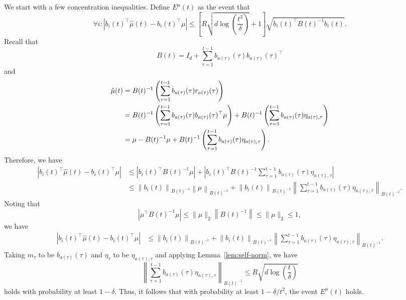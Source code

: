 \documentclass[letterpaper,11pt]{article}
\begin{document}
We start with a few concentration inequalities. 
Define $E^{\mu}(t)$ as the event that 
\begin{equation*}
    \forall i: \left|b_i(t)^\top \hat{\mu}(t) - b_i(t)^\top \mu\right| \leq \left[R \sqrt{d \log \left(\frac{t^3}{\delta}\right)} + 1\right] \sqrt{b_i(t)^\top B(t)^{-1} b_i(t)}. 
\end{equation*}
Recall that 
\begin{equation*}
    B(t) = I_d + \sum_{\tau=1}^{t-1} b_{a(\tau)}(\tau) b_{a(\tau)}(\tau)^\top 
\end{equation*}
and 
\begin{equation*}
\begin{aligned}
    \hat{\mu}(t) &= B(t)^{-1} \left(\sum_{\tau=1}^{t-1} b_{a(\tau)}(\tau) r_{a(\tau)}(\tau)\right) \\
    &= B(t)^{-1} \left(\sum_{\tau=1}^{t-1} b_{a(\tau)}(\tau) b_{a(\tau)}(\tau)^\top \mu\right) + B(t)^{-1} \left(\sum_{\tau=1}^{t-1} b_{a(\tau)}(\tau) \eta_{a(\tau), \tau}\right)\\
    &= \mu - B(t)^{-1} \mu + B(t)^{-1} \left(\sum_{\tau=1}^{t-1} b_{a(\tau)}(\tau) \eta_{a(\tau), \tau}\right). 
\end{aligned}
\end{equation*}
Therefore, we have
\begin{equation*}
\begin{aligned}
    \left|b_i(t)^\top \hat{\mu}(t) - b_i(t)^\top \mu\right| &\leq \left|b_i(t)^\top B(t)^{-1} \mu \right| + \left|b_i(t)^\top B(t)^{-1} \sum_{\tau=1}^{t-1} b_{a(\tau)}(\tau) \eta_{a(\tau), \tau}\right| \\
    &\leq \left\|b_i(t)\right\|_{B(t)^{-1}} \left\|\mu\right\|_{B(t)^{-1}} + \left\|b_i(t)\right\|_{B(t)^{-1}} \left\|\sum_{\tau=1}^{t-1} b_{a(\tau)}(\tau) \eta_{a(\tau), \tau}\right\|_{B(t)^{-1}}. 
\end{aligned}
\end{equation*}
Noting that 
\begin{equation*}
    \left|\mu^\top B(t)^{-1} \mu\right| \leq \|\mu\|_2 \left\| B(t)^{-1} \right\| \leq \|\mu\|_2 \leq 1, 
\end{equation*}
we have
\begin{equation*}
\begin{aligned}
    \left|b_i(t)^\top \hat{\mu}(t) - b_i(t)^\top \mu\right| &\leq \left\|b_i(t)\right\|_{B(t)^{-1}} + \left\|b_i(t)\right\|_{B(t)^{-1}} \left\|\sum_{\tau=1}^{t-1} b_{a(\tau)}(\tau) \eta_{a(\tau), \tau}\right\|_{B(t)^{-1}}. 
\end{aligned}
\end{equation*}
Taking $m_{\tau}$ to be $b_{a(\tau)}(\tau)$ and $\eta_{\tau}$ to be $\eta_{a(\tau), \tau}$ and applying Lemma~\ref{lem:self-norm}, we have
\begin{equation*}
    \left\|\sum_{\tau=1}^{t-1} b_{a(\tau)}(\tau) \eta_{a(\tau), \tau}\right\|_{B(t)^{-1}} \leq R \sqrt{d \log \left(\frac{t}{\delta}\right)}
\end{equation*}
holds with probability at least $1 - \delta$. 
Thus, it follows that with probability at least $1 - \delta/t^2$, the event $E^\mu(t)$ holds. 
\end{document}
